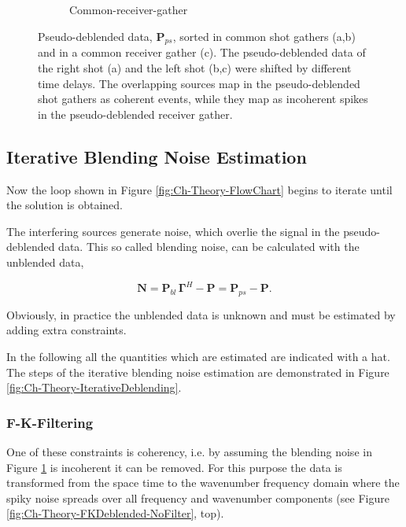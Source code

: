 \begin{figure}
\begin{subfigure}[t]{0.25\textwidth}
		\caption{Common-receiver-gather}
		\label{fig:Ch-Theory-PseudoDeblendedCRG}
	\end{subfigure}
	\caption{Pseudo-deblended data, $\mathbf{P}_{ps}$, sorted in common shot gathers (a,b) and in a common receiver gather (c). The pseudo-deblended data of the right shot (a) and the left shot (b,c) were shifted by different time delays. The overlapping sources map in the pseudo-deblended shot gathers as coherent events, while they map as incoherent spikes in the pseudo-deblended receiver gather.}
	\label{fig:Ch-Theory-PseudoDeblended}

\end{figure}


\subsection{Iterative Blending Noise Estimation} \label{sec:IterBlenNoiseEst}

Now the loop shown in Figure \ref{fig:Ch-Theory-FlowChart} begins to iterate until the solution is obtained. 

The interfering sources generate noise, which overlie the signal in the pseudo-deblended data. This so called blending noise, can be calculated with the unblended data,

\begin{equation}
	\mathbf{N} = \mathbf{P}_{bl} \, \mathbf{\Gamma}^H - \mathbf{P} = \mathbf{P}_{ps} - \mathbf{P}.
	\label{eq:Ch-Theory-Noise}
\end{equation}

Obviously, in practice the unblended data is unknown and must be estimated by adding extra constraints. 

In the following all the quantities which are estimated are indicated with a hat. The steps of the iterative blending noise estimation are demonstrated in Figure \ref{fig:Ch-Theory-IterativeDeblending}.


\subsubsection*{F-K-Filtering}

One of these constraints is coherency, i.e. by assuming the blending noise in Figure \ref{fig:Ch-Theory-PseudoDeblendedCRG} is incoherent it can be removed. For this purpose the data is transformed from the space time to the wavenumber frequency domain where the spiky noise spreads over all frequency and wavenumber components (see Figure \ref{fig:Ch-Theory-FKDeblended-NoFilter}, top). 



